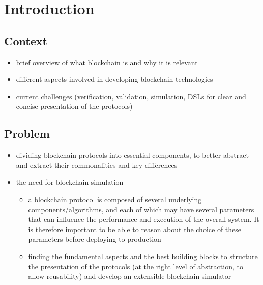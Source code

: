 

\chapter{Introduction}
\label{cha:introduction}

 

% 

\section{Context}

\begin{itemize}
  \item brief overview of what blockchain is and why it is relevant
  \item different aspects involved in developing blockchain technologies
  \item current challenges (verification, validation, simulation, DSLs for clear and concise presentation of the protocols)
\end{itemize}



\section{Problem}

\begin{itemize}
  \item dividing blockchain protocols into essential components, to better abstract and extract their commonalities and key differences
  \item the need for blockchain simulation
  \begin{itemize}
    \item a blockchain protocol is composed of several underlying components/algorithms, and each of which may have several parameters that can influence the performance and execution of the overall system. It is therefore important to be able to reason about the choice of these parameters before deploying to production
    \item finding the fundamental aspects and the best building blocks to structure the presentation of the protocols (at the right level of abstraction, to allow reusability) and develop an extensible blockchain simulator
  \end{itemize}
\end{itemize}




